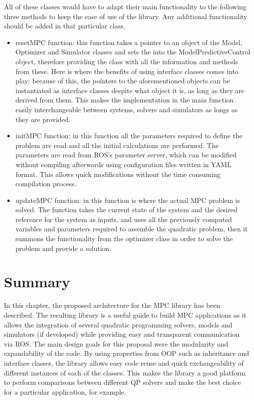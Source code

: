 All of these classes would have to adapt their main functionality to the following three methods to keep the ease of use of the library. Any additional functionality should be added in that particular class.

\begin{itemize}


\item resetMPC function: this function takes a pointer to an object of the Model, Optimizer and Simulator classes and sets the into the ModelPredictiveControl object, therefore providing the class with all the information and methods from these. Here is where the benefits of using interface classes comes into play: because of this, the pointers to the aforementioned objects can be instantiated as interface classes despite what object it is, as long as they are derived from them. This makes the implementation in the main function easily interchangeable between systems, solvers and simulators as longs as they are provided.

\item initMPC function: in this function all the parameters required to define the problem are read and all the initial calculations are performed. The parameters are read from ROS's parameter server, which can be modified without compiling afterwards using configuration files written in YAML format. This allows quick modifications without the time consuming compilation process.

\item updateMPC function: in this function is where the actual MPC problem is solved. The function takes the current state of the system and the desired reference for the system as inputs, and uses all the previously computed variables and parameters required to assemble the quadratic problem, then it summons the functionality from the optimizer class in order to solve the problem and provide a solution.   

\end{itemize}

\section{Summary}

In this chapter, the proposed architecture for the MPC library has been described. The resulting library is a useful guide to build MPC applications as it allows the integration of several quadratic programming solvers, models and simulators (if developed) while providing easy and transparent communication via ROS. The main design goals for this proposal were the modularity and expandability of the code. By using properties from OOP such as inheritance and interface classes, the library allows easy code reuse and quick exchangeability of different instances of each of the classes. This makes the library a good platform to perform comparisons between different QP solvers and make the best choice for a particular application, for example. 




